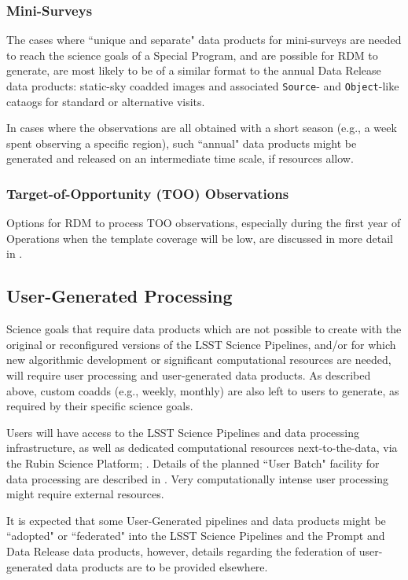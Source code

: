 \subsubsection{Mini-Surveys}

The cases where ``unique and separate" data products for mini-surveys are 
needed to reach the science goals of a Special Program, and are possible for 
RDM to generate, are most likely to be of a similar format to the annual 
Data Release data products: static-sky coadded images and associated 
{\tt Source}- and {\tt Object}-like cataogs for standard or alternative visits.

In cases where the observations are all obtained with a short season 
(e.g., a week spent observing a specific region), such ``annual" 
data products might be generated and released on an intermediate time scale, 
if resources allow.


\subsubsection{Target-of-Opportunity (TOO) Observations}

Options for RDM to process TOO observations, especially during the first year of Operations 
when the template coverage will be low, are discussed in more detail in 
.


\subsection{User-Generated Processing}\label{ssec:proc_user}

Science goals that require data products which are not possible to create with 
the original or reconfigured versions of the LSST Science Pipelines, 
and/or for which new algorithmic development or significant computational resources 
are needed, will require user processing and user-generated data products.
As described above, custom coadds (e.g., weekly, monthly) are also left to users 
to generate, as required by their specific science goals.

Users will have access to the LSST Science Pipelines and data processing 
infrastructure, as well as dedicated computational resources next-to-the-data, 
via the Rubin Science Platform; .
Details of the planned ``User Batch" facility for data processing are described in 
.
Very computationally intense user processing might require external resources. 

It is expected that some User-Generated pipelines and data products 
might be ``adopted" or ``federated" into the LSST Science Pipelines and the Prompt 
and Data Release data products, however, details regarding the federation of 
user-generated data products are to be provided elsewhere.

